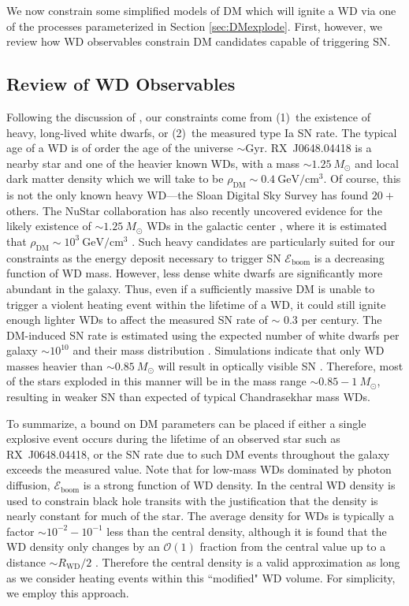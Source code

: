 \documentclass[twocolumn, preprintnumbers,amsmath,amssymb,prd, superscriptaddress]{revtex4}
\newcommand{\Eboom}{\mathcal{E}_\text{boom}}
\newcommand{\OO}{\mathcal{O}}
\newcommand{\GeV}{\text{GeV}}
\begin{document}
We now constrain some simplified models of DM which will ignite a WD via one of the processes parameterized in Section \ref{sec:DMexplode}.
First, however, we review how WD observables constrain DM candidates capable of triggering SN.

\subsection{Review of WD Observables}
Following the discussion of \cite{Graham:2015apa}, our constraints come from (1)~the existence of heavy, long-lived white dwarfs, or (2)~the measured type Ia SN rate.
The typical age of a WD is of order the age of the universe $\sim \text{Gyr}$.
RX~J0648.04418 is a nearby star and one of the heavier known WDs, with a mass $\sim 1.25 ~M_{\odot}$ \cite{Mereghetti:2013nba} and local dark matter density which we will take to be $\rho_\text{DM} \sim 0.4 ~\GeV/\text{cm}^3$.
Of course, this is not the only known heavy WD---the Sloan Digital Sky Survey \cite{SDSS} has found $20+$ others.
The NuStar collaboration has also recently uncovered evidence for the likely existence of $\sim 1.25 ~M_{\odot}$ WDs in the galactic center \cite{NuStar}, where it is estimated that $\rho_\text{DM} \sim 10^3 ~\text{GeV}/\text{cm}^3$ \cite{Nesti:2013uwa}.
Such heavy candidates are particularly suited for our constraints as the energy deposit necessary to trigger SN $\Eboom$ is a decreasing function of WD mass.
However, less dense white dwarfs are significantly more abundant in the galaxy.
Thus, even if a sufficiently massive DM is unable to trigger a violent heating event within the lifetime of a WD, it could still ignite enough lighter WDs to affect the measured SN rate of $\sim $ 0.3 per century.
The DM-induced SN rate is estimated using the expected number of white dwarfs per galaxy $\sim 10^{10}$ and their mass distribution \cite{SDSS}.
Simulations indicate that only WD masses heavier than $\sim 0.85 ~M_{\odot}$ will result in optically visible SN \cite{Graham:2015apa}.
Therefore, most of the stars exploded in this manner will be in the mass range $\sim 0.85 - 1 ~M_{\odot}$, resulting in weaker SN than expected of typical Chandrasekhar mass WDs.

To summarize, a bound on DM parameters can be placed if either a single explosive event occurs during the lifetime of an observed star such as RX~J0648.04418, or the SN rate due to such DM events throughout the galaxy exceeds the measured value.
Note that for low-mass WDs dominated by photon diffusion, $\Eboom$ is a strong function of WD density.
In \cite{Graham:2015apa} the central WD density is used to constrain black hole transits with the justification that the density is nearly constant for much of the star.
The average density for WDs is typically a factor $\sim 10^{-2} - 10^{-1}$ less than the central density, although it is found that the WD density only changes by an $\OO(1)$ fraction from the central value up to a distance $\sim R_\text{WD}/2$ \cite{Chandrasekhar}.
Therefore the central density is a valid approximation as long as we consider heating events within this ``modified" WD volume.
For simplicity, we employ this approach.
\end{document}
